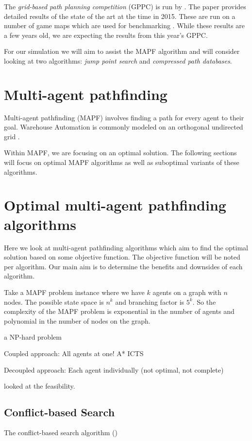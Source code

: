 \documentclass[a4paper,11pt]{article}
\begin{document}
The \textit{grid-based path planning competition} (GPPC) is run by \cite{sturtevant2015grid}. The paper provides detailed results of the state of the art at the time in 2015. These are run on a number of game maps which are used for benchmarking \cite{sturtevant2012benchmarks}. While these results are a few years old, we are expecting the results from this year's GPPC.

For our simulation we will aim to assist the MAPF algorithm and will consider looking at two algorithms: \textit{jump point search} and \textit{compressed path databases}.


\section{Multi-agent pathfinding}
Multi-agent pathfinding (MAPF) involves finding a path for every agent to their goal. Warehouse Automation is commonly modeled on an orthogonal undirected grid \cite{TODO}. 


Within MAPF, we are focusing on an optimal solution. The following sections will focus on optimal MAPF algorithms as well as suboptimal variants of these algorithms.


\section{Optimal multi-agent pathfinding algorithms}
Here we look at multi-agent pathfinding algorithms which aim to find the optimal solution based on some objective function. The objective function will be noted per algorithm. Our main aim is to determine the benefits and downsides of each algorithm.


Take a MAPF problem instance where we have $k$ agents on a graph with $n$ nodes. The possible state space is $n^k$ and branching factor is $5^k$. So the complexity of the MAPF problem is exponential in the number of agents and polynomial in the number of nodes on the graph.

a NP-hard problem

Coupled approach: All agents at one! A* ICTS

Decoupled approach: Each agent individually (not optimal, not complete)

\cite{krontiris2013feasibility} looked at the feasibility.

\subsection{Conflict-based Search}
The conflict-based search algorithm (\cite{sharon2015conflict})
\end{document}
